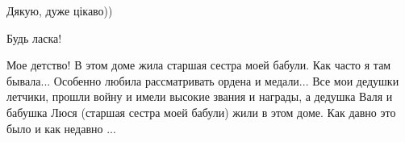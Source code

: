 \begin{itemize}
\begin{itemize}
\end{itemize} %

Дякую, дуже цікаво))

Будь ласка!


Мое детство! В этом доме жила старшая сестра моей бабули. Как часто я там
бывала... Особенно любила рассматривать ордена и медали... Все мои дедушки
летчики, прошли войну и имели высокие звания и награды, а дедушка Валя и
бабушка Люся (старшая сестра моей бабули) жили в этом доме. Как давно это было
и как недавно ...

\end{itemize} %
